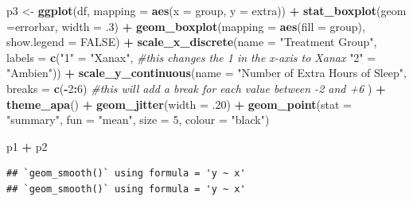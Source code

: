 \documentclass[
]{book}
\newenvironment{Shaded}{\begin{snugshade}}{\end{snugshade}}
\newcommand{\AttributeTok}[1]{\textcolor[rgb]{0.13,0.29,0.53}{#1}}
\newcommand{\CommentTok}[1]{\textcolor[rgb]{0.56,0.35,0.01}{\textit{#1}}}
\newcommand{\ConstantTok}[1]{\textcolor[rgb]{0.56,0.35,0.01}{#1}}
\newcommand{\DecValTok}[1]{\textcolor[rgb]{0.00,0.00,0.81}{#1}}
\newcommand{\FunctionTok}[1]{\textcolor[rgb]{0.13,0.29,0.53}{\textbf{#1}}}
\newcommand{\NormalTok}[1]{#1}
\newcommand{\OtherTok}[1]{\textcolor[rgb]{0.56,0.35,0.01}{#1}}
\newcommand{\SpecialCharTok}[1]{\textcolor[rgb]{0.81,0.36,0.00}{\textbf{#1}}}
\newcommand{\StringTok}[1]{\textcolor[rgb]{0.31,0.60,0.02}{#1}}
\begin{document}
\begin{Shaded}
\begin{Highlighting}[]
\NormalTok{p3 }\OtherTok{\textless{}{-}} \FunctionTok{ggplot}\NormalTok{(df, }\AttributeTok{mapping =} \FunctionTok{aes}\NormalTok{(}\AttributeTok{x =}\NormalTok{ group, }\AttributeTok{y =}\NormalTok{ extra)) }\SpecialCharTok{+} 
  \FunctionTok{stat\_boxplot}\NormalTok{(}\AttributeTok{geom =}\StringTok{\textquotesingle{}errorbar\textquotesingle{}}\NormalTok{, }\AttributeTok{width =}\NormalTok{ .}\DecValTok{3}\NormalTok{) }\SpecialCharTok{+}
  \FunctionTok{geom\_boxplot}\NormalTok{(}\AttributeTok{mapping =} \FunctionTok{aes}\NormalTok{(}\AttributeTok{fill =}\NormalTok{ group), }\AttributeTok{show.legend =} \ConstantTok{FALSE}\NormalTok{) }\SpecialCharTok{+} 
  \FunctionTok{scale\_x\_discrete}\NormalTok{(}\AttributeTok{name =} \StringTok{"Treatment Group"}\NormalTok{,}
                   \AttributeTok{labels =} \FunctionTok{c}\NormalTok{(}\StringTok{"1"}  \OtherTok{=} \StringTok{"Xanax"}\NormalTok{, }\CommentTok{\#this changes the 1 in the x{-}axis to Xanax}
                              \StringTok{"2"} \OtherTok{=} \StringTok{"Ambien"}\NormalTok{)) }\SpecialCharTok{+}
  \FunctionTok{scale\_y\_continuous}\NormalTok{(}\AttributeTok{name =} \StringTok{"Number of Extra Hours of Sleep"}\NormalTok{, }
                     \AttributeTok{breaks =} \FunctionTok{c}\NormalTok{(}\SpecialCharTok{{-}}\DecValTok{2}\SpecialCharTok{:}\DecValTok{6}\NormalTok{) }\CommentTok{\#this will add a break for each value between {-}2 and +6}
\NormalTok{                     ) }\SpecialCharTok{+}
  \FunctionTok{theme\_apa}\NormalTok{() }\SpecialCharTok{+}
  \FunctionTok{geom\_jitter}\NormalTok{(}\AttributeTok{width =}\NormalTok{ .}\DecValTok{20}\NormalTok{) }\SpecialCharTok{+}
  \FunctionTok{geom\_point}\NormalTok{(}\AttributeTok{stat =} \StringTok{"summary"}\NormalTok{, }\AttributeTok{fun =} \StringTok{"mean"}\NormalTok{, }\AttributeTok{size =} \DecValTok{5}\NormalTok{, }\AttributeTok{colour =} \StringTok{"black"}\NormalTok{)}


\NormalTok{p1 }\SpecialCharTok{+}\NormalTok{ p2}
\end{Highlighting}
\end{Shaded}

\begin{verbatim}
## `geom_smooth()` using formula = 'y ~ x'
## `geom_smooth()` using formula = 'y ~ x'
\end{verbatim}
\end{document}
